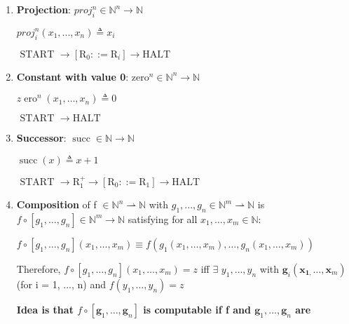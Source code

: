 \documentclass{article}
\begin{document}
\begin{enumerate}
    \item \textbf{Projection}: $proj^{n}_{i} \in \mathbb{N}^{n} \rightarrow \mathbb{N}$
    
    
    $proj^{n}_{i}(x_{1}, ..., x_{n}) \triangleq x_{i}$
    
    $\text { START } \rightarrow\left[\mathrm{R}_{0} : :=\mathrm{R}_{i}\right] \rightarrow \mathrm{HALT}$
    
    \item \textbf{Constant with value 0}: $\mathrm{zero}^{n} \in \mathbb{N}^{n} \rightarrow \mathbb{N}$
    
    
    $z \operatorname{ero}^{n}\left(x_{1}, \ldots, x_{n}\right) \triangleq 0$
    
    $\text { START } \rightarrow \mathrm{HALT}$
    
    \item \textbf{Successor}: $\operatorname{succ} \in \mathbb{N} \rightarrow \mathbb{N}$
    
    
    $\operatorname{succ}(x) \triangleq x+1$
    
    $\text { START } \rightarrow \mathrm{R}_{1}^{+} \rightarrow\left[\mathrm{R}_{0} : :=\mathrm{R}_{1}\right] \rightarrow \mathrm{HALT}$
    
    \item \textbf{Composition} of f $\in \mathbb{N}^{n} \rightharpoonup \mathbb{N}$ with $g_{1}, ..., g_{n} \in \mathbb{N}^{m} \rightharpoonup \mathbb{N}$ is $f \circ\left[g_{1}, \ldots, g_{n}\right] \in \mathbb{N}^{m} \rightarrow \mathbb{N}$ satisfying for all $x_{1}, \dots, x_{m} \in \mathbb{N}$:
    
    $f \circ\left[g_{1}, \ldots, g_{n}\right]\left(x_{1}, \ldots, x_{m}\right) \equiv f\left(g_{1}\left(x_{1}, \ldots, x_{m}\right), \ldots, g_{n}\left(x_{1}, \ldots, x_{m}\right)\right)$
    
    \bigskip
    Therefore, $f \circ\left[g_{1}, \ldots, g_{n}\right]\left(x_{1}, \ldots, x_{m}\right)=z$ iff $\exists$ $y_{1}, \dots, y_{n}$ with $\boldsymbol{g}_{i}\left(\boldsymbol{x}_{\mathbf{1},} \ldots, \boldsymbol{x}_{m}\right)$ (for i = 1, ..., n) and $f\left(y_{1}, \ldots, y_{n}\right)=z$
    
    \bigskip
    \textbf{Idea is that $f \circ\left[\boldsymbol{g}_{1}, \ldots, \boldsymbol{g}_{n}\right]$ is computable if f and $\boldsymbol{g}_{1}, \ldots, \boldsymbol{g}_{n}$ are}
    

\end{enumerate}
\end{document}

